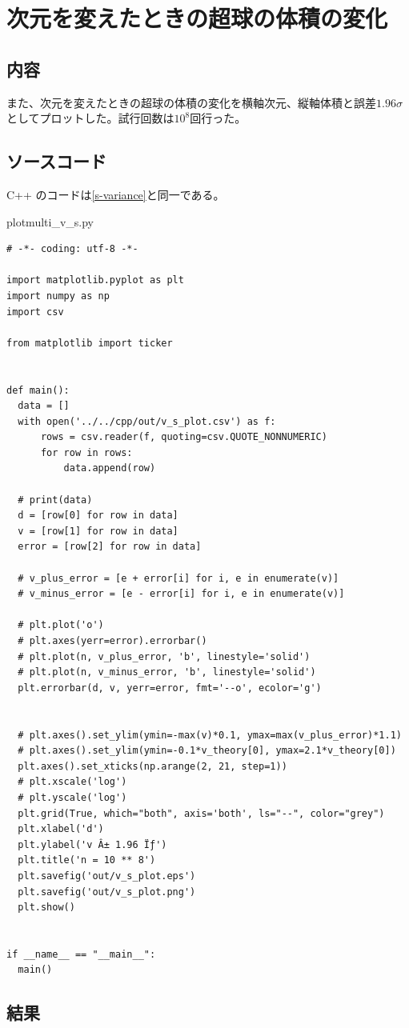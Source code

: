 \documentclass[a4paper,twoside]{jarticle}
\begin{document}
\section{次元を変えたときの超球の体積の変化}
\subsection{内容}
また、次元を変えたときの超球の体積の変化を横軸次元、縦軸体積と誤差$1.96 \sigma$としてプロットした。試行回数は$10^8$回行った。

\subsection{ソースコード}
C++ のコードは\ref{s-variance}と同一である。

plotmulti\_v\_s.py
\begin{lstlisting}
# -*- coding: utf-8 -*-

import matplotlib.pyplot as plt
import numpy as np
import csv

from matplotlib import ticker


def main():
  data = []
  with open('../../cpp/out/v_s_plot.csv') as f:
      rows = csv.reader(f, quoting=csv.QUOTE_NONNUMERIC)
      for row in rows:
          data.append(row)

  # print(data)
  d = [row[0] for row in data]
  v = [row[1] for row in data]
  error = [row[2] for row in data]

  # v_plus_error = [e + error[i] for i, e in enumerate(v)]
  # v_minus_error = [e - error[i] for i, e in enumerate(v)]

  # plt.plot('o')
  # plt.axes(yerr=error).errorbar()
  # plt.plot(n, v_plus_error, 'b', linestyle='solid')
  # plt.plot(n, v_minus_error, 'b', linestyle='solid')
  plt.errorbar(d, v, yerr=error, fmt='--o', ecolor='g')


  # plt.axes().set_ylim(ymin=-max(v)*0.1, ymax=max(v_plus_error)*1.1)
  # plt.axes().set_ylim(ymin=-0.1*v_theory[0], ymax=2.1*v_theory[0])
  plt.axes().set_xticks(np.arange(2, 21, step=1))
  # plt.xscale('log')
  # plt.yscale('log')
  plt.grid(True, which="both", axis='both', ls="--", color="grey")
  plt.xlabel('d')
  plt.ylabel('v Â± 1.96 Ïƒ')
  plt.title('n = 10 ** 8')
  plt.savefig('out/v_s_plot.eps')
  plt.savefig('out/v_s_plot.png')
  plt.show()


if __name__ == "__main__":
  main()
\end{lstlisting}

\subsection{結果}
\end{document}
